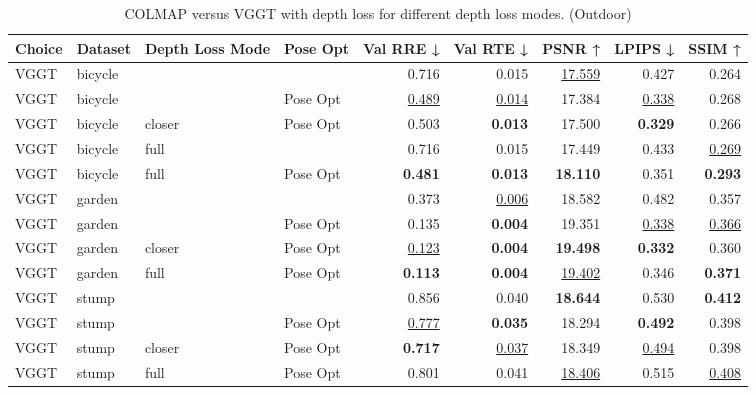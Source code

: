 \begin{table}[H]
\caption{\ifdefined\customcaption \customcaption \else COLMAP versus VGGT with depth loss for different depth loss modes. (Outdoor) \fi}
\label{tab:05_depth_loss_mode_pose_opt_outdoor}
\centering
\scriptsize
\begin{tabular}{llllrrrrr}
\toprule
Choice & Dataset & Depth Loss Mode & Pose Opt & Val RRE ↓ & Val RTE ↓ & PSNR ↑ & LPIPS ↓ & SSIM ↑ \\
\midrule
VGGT & bicycle &  &  & 0.716 & 0.015 & \underline{17.559} & 0.427 & 0.264 \\
VGGT & bicycle &  & Pose Opt & \underline{0.489} & \underline{0.014} & 17.384 & \underline{0.338} & 0.268 \\
VGGT & bicycle & closer & Pose Opt & 0.503 & \textbf{0.013} & 17.500 & \textbf{0.329} & 0.266 \\
VGGT & bicycle & full &  & 0.716 & 0.015 & 17.449 & 0.433 & \underline{0.269} \\
VGGT & bicycle & full & Pose Opt & \textbf{0.481} & \textbf{0.013} & \textbf{18.110} & 0.351 & \textbf{0.293} \\
\midrule
VGGT & garden &  &  & 0.373 & \underline{0.006} & 18.582 & 0.482 & 0.357 \\
VGGT & garden &  & Pose Opt & 0.135 & \textbf{0.004} & 19.351 & \underline{0.338} & \underline{0.366} \\
VGGT & garden & closer & Pose Opt & \underline{0.123} & \textbf{0.004} & \textbf{19.498} & \textbf{0.332} & 0.360 \\
VGGT & garden & full & Pose Opt & \textbf{0.113} & \textbf{0.004} & \underline{19.402} & 0.346 & \textbf{0.371} \\
\midrule
VGGT & stump &  &  & 0.856 & 0.040 & \textbf{18.644} & 0.530 & \textbf{0.412} \\
VGGT & stump &  & Pose Opt & \underline{0.777} & \textbf{0.035} & 18.294 & \textbf{0.492} & 0.398 \\
VGGT & stump & closer & Pose Opt & \textbf{0.717} & \underline{0.037} & 18.349 & \underline{0.494} & 0.398 \\
VGGT & stump & full & Pose Opt & 0.801 & 0.041 & \underline{18.406} & 0.515 & \underline{0.408} \\
\bottomrule
\end{tabular}
\end{table}